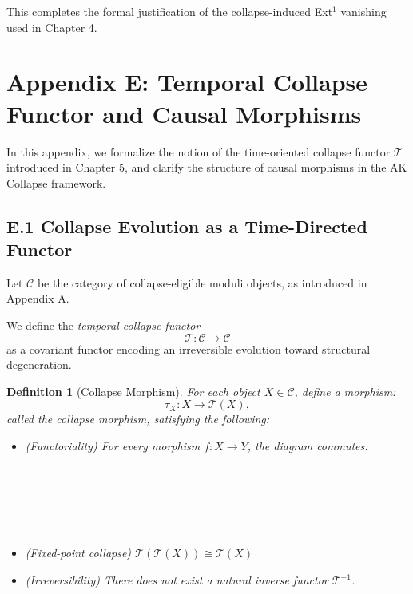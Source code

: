 \documentclass[11pt]{article}
\newtheorem{definition}[theorem]{Definition}
\begin{document}
This completes the formal justification of the collapse-induced Ext$^1$ vanishing used in Chapter 4.



\section*{Appendix E: Temporal Collapse Functor and Causal Morphisms}

In this appendix, we formalize the notion of the time-oriented collapse functor $\mathcal{T}$  
introduced in Chapter 5, and clarify the structure of causal morphisms in the AK Collapse framework.

\subsection*{E.1 Collapse Evolution as a Time-Directed Functor}

Let $\mathcal{C}$ be the category of collapse-eligible moduli objects, as introduced in Appendix A.

We define the \emph{temporal collapse functor}
\[
\mathcal{T} : \mathcal{C} \to \mathcal{C}
\]
as a covariant functor encoding an irreversible evolution toward structural degeneration.

\begin{definition}[Collapse Morphism]
For each object $X \in \mathcal{C}$, define a morphism:
\[
\tau_X : X \longrightarrow \mathcal{T}(X),
\]
called the \emph{collapse morphism}, satisfying the following:
\begin{itemize}
    \item (Functoriality) For every morphism $f : X \to Y$, the diagram commutes:
    
　　\begin{center}
　　\end{center}

    \item (Fixed-point collapse) $\mathcal{T}(\mathcal{T}(X)) \cong \mathcal{T}(X)$
    \item (Irreversibility) There does not exist a natural inverse functor $\mathcal{T}^{-1}$.
\end{itemize}
\end{definition}
\end{document}
